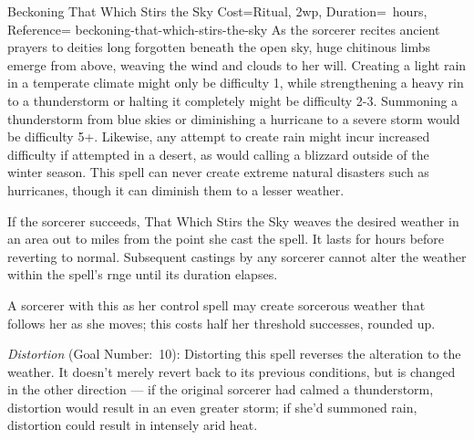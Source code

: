 



\begin{Spell}{Beckoning That Which Stirs the Sky}{%
    Cost={Ritual, 2wp},
    Duration={~hours},
    Reference=\cite*[p.~309]{db}
}{beckoning-that-which-stirs-the-sky}
    As the sorcerer recites ancient prayers to deities long forgotten beneath
    the open sky, huge chitinous limbs emerge from above, weaving the wind and
    clouds to her will.  Creating a light rain in a temperate
    climate might only be difficulty 1, while strengthening a heavy rin to a
    thunderstorm or halting it completely might be difficulty 2-3. Summoning a
    thunderstorm from blue skies or diminishing a hurricane to a severe storm
    would be difficulty 5+. Likewise, any attempt to create rain might incur
    increased difficulty if attempted in a desert, as would calling a blizzard
    outside of the winter season. This spell can never create extreme natural
    disasters such as hurricanes, though it can diminish them to a lesser
    weather.

    If the sorcerer succeeds, That Which Stirs the Sky weaves the desired
    weather in an area out to  miles from the point she cast the spell. It lasts for  hours before reverting to normal. Subsequent
    castings by any sorcerer cannot alter the weather within the spell's rnge
    until its duration elapses. 

    \begin{Unavailable}
        A sorcerer with this as her control spell may create sorcerous weather
        that follows her as she moves; this costs half her threshold successes,
        rounded up.
    \end{Unavailable}

    \textit{Distortion} (Goal Number:~10): Distorting this spell reverses the
    alteration to the weather. It doesn't merely revert back to its previous
    conditions, but is changed in the other direction --- if the original
    sorcerer had calmed a thunderstorm, distortion would result in an even
    greater storm; if she'd summoned rain, distortion could result in intensely
    arid heat.
\end{Spell}


